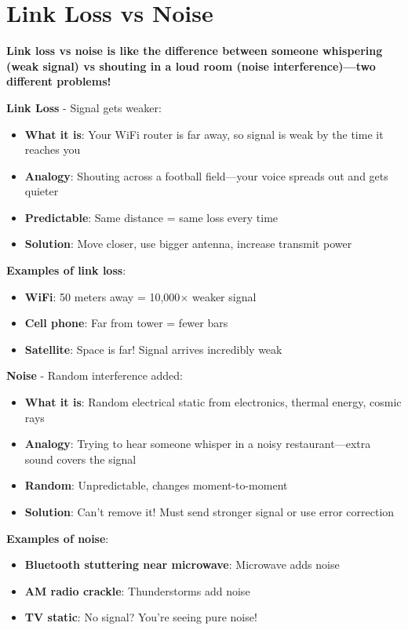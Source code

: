 \chapter{Link Loss vs Noise}
\label{ch:link-loss-vs-noise}

\begin{nontechnical}
\textbf{Link loss vs noise is like the difference between someone whispering (weak signal) vs shouting in a loud room (noise interference)---two different problems!}

\textbf{Link Loss} - Signal gets weaker:
\begin{itemize}
\item \textbf{What it is}: Your WiFi router is far away, so signal is weak by the time it reaches you
\item \textbf{Analogy}: Shouting across a football field---your voice spreads out and gets quieter
\item \textbf{Predictable}: Same distance = same loss every time
\item \textbf{Solution}: Move closer, use bigger antenna, increase transmit power
\end{itemize}

\textbf{Examples of link loss}:
\begin{itemize}
\item \textbf{WiFi}: 50 meters away = 10,000$\times$ weaker signal
\item \textbf{Cell phone}: Far from tower = fewer bars
\item \textbf{Satellite}: Space is far! Signal arrives incredibly weak
\end{itemize}

\textbf{Noise} - Random interference added:
\begin{itemize}
\item \textbf{What it is}: Random electrical static from electronics, thermal energy, cosmic rays
\item \textbf{Analogy}: Trying to hear someone whisper in a noisy restaurant---extra sound covers the signal
\item \textbf{Random}: Unpredictable, changes moment-to-moment
\item \textbf{Solution}: Can't remove it! Must send stronger signal or use error correction
\end{itemize}

\textbf{Examples of noise}:
\begin{itemize}
\item \textbf{Bluetooth stuttering near microwave}: Microwave adds noise
\item \textbf{AM radio crackle}: Thunderstorms add noise
\item \textbf{TV static}: No signal? You're seeing pure noise!
\end{itemize}


\end{nontechnical}
